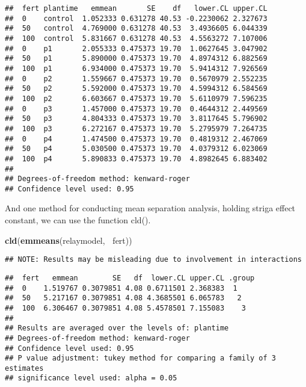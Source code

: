 \documentclass[]{book}
\newenvironment{Shaded}{\begin{snugshade}}{\end{snugshade}}
\newcommand{\KeywordTok}[1]{\textcolor[rgb]{0.13,0.29,0.53}{\textbf{#1}}}
\newcommand{\OperatorTok}[1]{\textcolor[rgb]{0.81,0.36,0.00}{\textbf{#1}}}
\newcommand{\NormalTok}[1]{#1}
\theoremstyle{definition}
\theoremstyle{definition}
\theoremstyle{definition}
\theoremstyle{remark}
\begin{document}
\begin{verbatim}
##  fert plantime   emmean       SE    df   lower.CL upper.CL
##  0    control  1.052333 0.631278 40.53 -0.2230062 2.327673
##  50   control  4.769000 0.631278 40.53  3.4936605 6.044339
##  100  control  5.831667 0.631278 40.53  4.5563272 7.107006
##  0    p1       2.055333 0.475373 19.70  1.0627645 3.047902
##  50   p1       5.890000 0.475373 19.70  4.8974312 6.882569
##  100  p1       6.934000 0.475373 19.70  5.9414312 7.926569
##  0    p2       1.559667 0.475373 19.70  0.5670979 2.552235
##  50   p2       5.592000 0.475373 19.70  4.5994312 6.584569
##  100  p2       6.603667 0.475373 19.70  5.6110979 7.596235
##  0    p3       1.457000 0.475373 19.70  0.4644312 2.449569
##  50   p3       4.804333 0.475373 19.70  3.8117645 5.796902
##  100  p3       6.272167 0.475373 19.70  5.2795979 7.264735
##  0    p4       1.474500 0.475373 19.70  0.4819312 2.467069
##  50   p4       5.030500 0.475373 19.70  4.0379312 6.023069
##  100  p4       5.890833 0.475373 19.70  4.8982645 6.883402
## 
## Degrees-of-freedom method: kenward-roger 
## Confidence level used: 0.95
\end{verbatim}

And one method for conducting mean separation analysis, holding striga
effect constant, we can use the function cld().

\begin{Shaded}
\begin{Highlighting}[]
\KeywordTok{cld}\NormalTok{(}\KeywordTok{emmeans}\NormalTok{(relaymodel, }\OperatorTok{~}\NormalTok{fert))}
\end{Highlighting}
\end{Shaded}

\begin{verbatim}
## NOTE: Results may be misleading due to involvement in interactions
\end{verbatim}

\begin{verbatim}
##  fert   emmean        SE   df  lower.CL upper.CL .group
##  0    1.519767 0.3079851 4.08 0.6711501 2.368383  1    
##  50   5.217167 0.3079851 4.08 4.3685501 6.065783   2   
##  100  6.306467 0.3079851 4.08 5.4578501 7.155083    3  
## 
## Results are averaged over the levels of: plantime 
## Degrees-of-freedom method: kenward-roger 
## Confidence level used: 0.95 
## P value adjustment: tukey method for comparing a family of 3 estimates 
## significance level used: alpha = 0.05
\end{verbatim}
\end{document}
